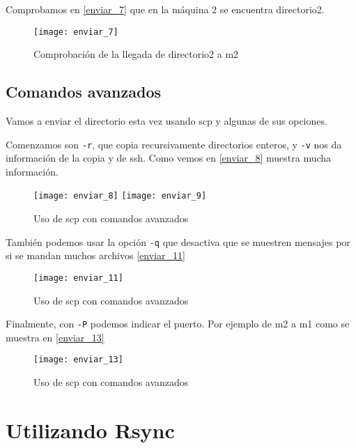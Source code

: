 Comprobamos en \eqref{enviar_7} que en la máquina 2 se encuentra directorio2.

\begin{figure}[h!]
\begin{center}
\caption{Comprobación de la llegada de directorio2 a m2}
\label{enviar_7}
\texttt{[image: enviar\_7]}
\end{center}
\end{figure}

\section{Comandos avanzados}

Vamos a enviar el directorio esta vez usando scp y algunas de sus opciones.

Comenzamos son \verb|-r|, que copia recursivamente directorios enteros, y \verb|-v| nos da información de la copia y de ssh. Como vemos en \eqref{enviar_8} muestra mucha información.

\begin{figure}[h!]
\begin{center}
\caption{Uso de scp con comandos avanzados}
\label{enviar_8}
\texttt{[image: enviar\_8]}
\texttt{[image: enviar\_9]}
\end{center}
\end{figure}

También podemos usar la opción \verb|-q| que desactiva que se muestren mensajes por si se mandan muchos archivos \eqref{enviar_11}

\begin{figure}[h!]
\begin{center}
\caption{Uso de scp con comandos avanzados}
\label{enviar_11}
\texttt{[image: enviar\_11]}
\end{center}
\end{figure}

Finalmente, con \verb|-P| podemos indicar el puerto. Por ejemplo de m2 a m1 como se muestra en \eqref{enviar_13}

\begin{figure}[h!]
\begin{center}
\caption{Uso de scp con comandos avanzados}
\label{enviar_13}
\texttt{[image: enviar\_13]}
\end{center}
\end{figure}


\chapter{Utilizando Rsync}

